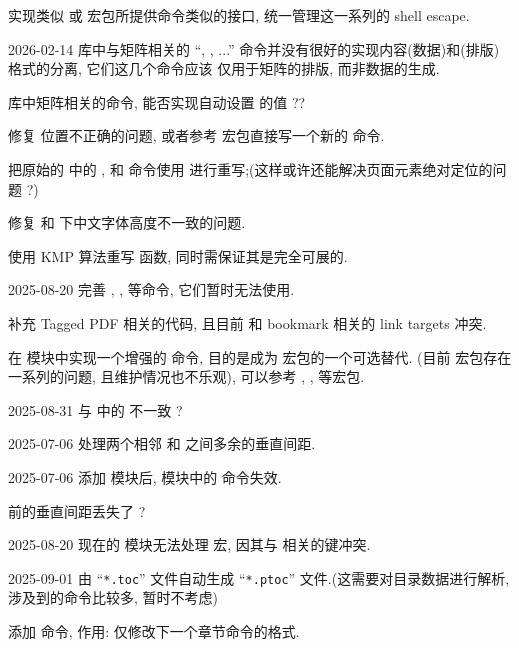 \begin{todolist}
  \item 实现类似  或  宏包所提供命令类似的接口, 统一管理这一系列的 shell escape. 
  \item [2026-02-14]  库中与矩阵相关的 ``, , ...'' 命令并没有很好的实现内容(数据)和(排版)格式的分离, 它们这几个命令应该
    仅用于矩阵的排版, 而非数据的生成.
  \item {} 库中矩阵相关的命令, 能否实现自动设置  的值 ??
  \item 修复  位置不正确的问题, 或者参考  宏包直接写一个新的  命令.
  \item 把原始的  中的 ,  和  命令使用  进行重写;(这样或许还能解决页面元素绝对定位的问题 ?)
  \item 修复  和  下中文字体高度不一致的问题.
  \item 使用 KMP 算法重写  函数, 同时需保证其是完全可展的.
  \item [2025-08-20] 完善 , ,  等命令, 它们暂时无法使用.
  \item 补充 Tagged PDF 相关的代码, 且目前 \cmd{\DocumentMetadata} 和 bookmark 相关的 link targets 冲突.
  \item 在  模块中实现一个增强的  命令, 目的是成为  宏包的一个可选替代. (目前  宏包存在一系列的问题, 且维护情况也不乐观), 可以参考 , ,  等宏包.
  \item [2025-08-31]  与  中的  不一致 ?
  \item [2025-07-06] 处理两个相邻  和  之间多余的垂直间距.
  \item [2025-07-06] 添加  模块后,  模块中的  命令失效.
  \item *[真正的原因是: \cs{paragraph} 后的垂直间距被忽略, 因为它被转为了水平间距]  前的垂直间距丢失了 ?
  \item [2025-08-20] 现在的  模块无法处理  宏, 因其与  相关的键冲突.
  \item [2025-09-01] 由 ``\texttt{*.toc}'' 文件自动生成 ``\texttt{*.ptoc}'' 文件.(这需要对目录数据进行解析, 涉及到的命令比较多, 暂时不考虑)
  \item *[使用 \cs{UseTemplate} 命令即可实现一次性的标题样式] 添加  命令, 作用: 仅修改下一个章节命令的格式.

\end{todolist}
